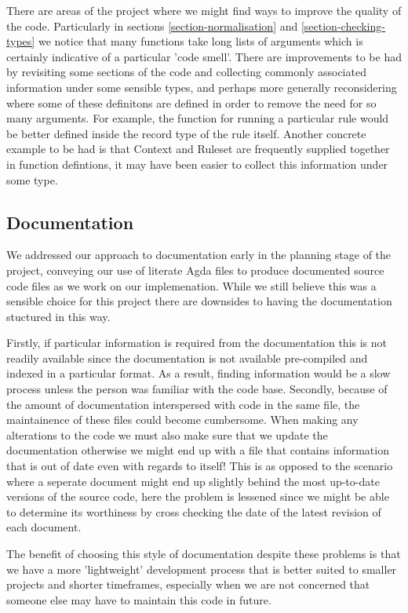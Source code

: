 There are areas of the project where we might find ways to
improve the quality of the code. Particularly in sections
\ref{section-normalisation} and \ref{section-checking-types} we notice
that many functions take long lists of arguments which is certainly
indicative of a particular 'code smell'. There are improvements to be
had by revisiting some sections of the code and collecting commonly
associated information under some sensible types, and perhaps more
generally reconsidering where some of these definitons are defined in order
to remove the need for so many arguments. For example, the function
for running a particular rule would be better defined inside the
record type of the rule itself. Another concrete example to be had is
that Context and Ruleset are frequently supplied together in
function defintions, it may have been easier to collect this
information under some type.

\subsection{Documentation}

We addressed our approach to documentation early in the planning stage
of the project, conveying our use of literate Agda files to produce
documented source code files as we work on our implemenation. While we
still believe this was a sensible choice for this project there are
downsides to having the documentation stuctured in this way.

Firstly, if particular information is required from the documentation
this is not readily available since the documentation is not available
pre-compiled and indexed in a particular format. As a result, finding
information would be a slow process unless the person was familiar
with the code base. Secondly, because of the amount of documentation
interspersed with code in the same file, the maintainence of these
files could become cumbersome. When making any alterations to the code
we must also make sure that we update the documentation otherwise we
might end up with a file that contains information that is out of date
even with regards to itself! This is as opposed to the scenario where a
seperate document might end up slightly behind the most up-to-date
versions of the source code, here the problem is lessened since we
might be able to determine its worthiness by cross checking the date
of the latest revision of each document.

The benefit of choosing this style of documentation despite
these problems is that we have a more 'lightweight' development
process that is better suited to smaller projects and shorter
timeframes, especially when we are not concerned that someone else
may have to maintain this code in future.

